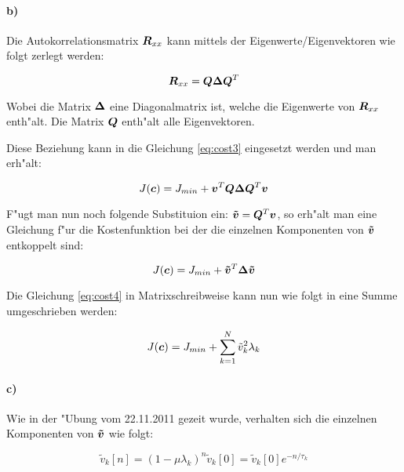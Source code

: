 \paragraph{b)}

Die Autokorrelationsmatrix $\bm{R}_{xx}$ kann mittels der Eigenwerte/Eigenvektoren wie folgt zerlegt werden:

\begin{equation}
\bm{R}_{xx} = \bm{Q}\bm{\Delta}\bm{Q}^T
\end{equation}

Wobei die Matrix $\bm{\Delta}$ eine Diagonalmatrix ist, welche die Eigenwerte von $\bm{R}_{xx}$ enth"alt.
Die Matrix $\bm{Q}$ enth"alt alle Eigenvektoren.

Diese Beziehung kann in die Gleichung \ref{eq:cost3} eingesetzt werden und man erh"alt:

\begin{equation}
 J(\bm{c}) = J_{min} + \bm{v}^T\bm{Q}\bm{\Delta}\bm{Q}^T\bm{v}
\label{eq:costasfd}
\end{equation}

F"ugt man nun noch folgende Substituion ein: $\bm{\tilde{v}} = \bm{Q}^T\bm{v}$, so erh"alt man
eine Gleichung f"ur die Kostenfunktion bei der die einzelnen Komponenten von $\bm{\tilde{v}}$ entkoppelt sind:

\begin{equation}
 J(\bm{c}) = J_{min} + \bm{\tilde{v}}^T\bm{\Delta}\bm{\tilde{v}}
\label{eq:cost4}
\end{equation}

Die Gleichung \ref{eq:cost4} in Matrixschreibweise kann nun wie folgt in eine Summe umgeschrieben werden:

\begin{equation}
 J(\bm{c}) = J_{min} + \sum_{k=1}^N \tilde{v}_k^2 \lambda_k
\label{eq:cost5}
\end{equation}

\paragraph{c)}

Wie in der "Ubung vom 22.11.2011 gezeit wurde, verhalten sich die einzelnen Komponenten von $\bm{\tilde{v}}$
wie folgt:

\begin{equation}
 \tilde{v}_k[n] = (1-\mu \lambda_k)^n \tilde{v}_k[0] = \tilde{v}_k[0]e^{-n/\tau_k}
\label{eq:misalignment_evolution}
\end{equation}

